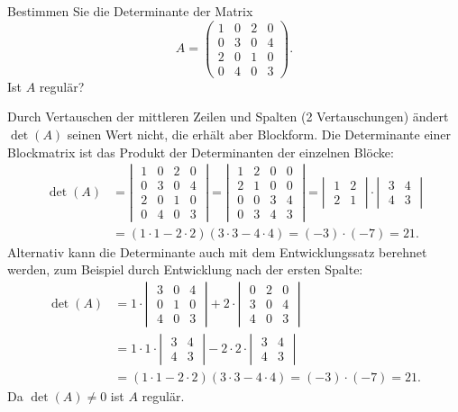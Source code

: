 Bestimmen Sie die Determinante der Matrix
\[
A=\begin{pmatrix}
1&0&2&0\\
0&3&0&4\\
2&0&1&0\\
0&4&0&3
\end{pmatrix}.
\]
Ist $A$ regulär?


\begin{loesung}
Durch Vertauschen der mittleren Zeilen und Spalten (2 Vertauschungen) ändert $\det(A)$
seinen Wert nicht, die erhält aber Blockform. Die Determinante einer Blockmatrix ist
das Produkt der Determinanten der einzelnen Blöcke:
\begin{align*}
\det(A)&=
\left|\;\begin{matrix}
1&0&2&0\\
0&3&0&4\\
2&0&1&0\\
0&4&0&3
\end{matrix}\;\right|
=
\left|\;\begin{matrix}
1&2&0&0\\
2&1&0&0\\
0&0&3&4\\
0&3&4&3
\end{matrix}\;\right|
=
\left|\;\begin{matrix}
1&2\\2&1
\end{matrix}\;\right|
\cdot
\left|\;\begin{matrix}
3&4\\4&3
\end{matrix}\;\right|
\\
&=
(1\cdot 1-2\cdot 2)(3\cdot 3-4\cdot 4)=(-3)\cdot(-7)=21.
\end{align*}
Alternativ kann die Determinante auch mit dem Entwicklungssatz
berehnet werden, zum Beispiel durch Entwicklung nach der ersten
Spalte:
\begin{align*}
\det(A)
&=
1\cdot\left|\;\begin{matrix}
3&0&4\\
0&1&0\\
4&0&3
\end{matrix}\;\right|
+
2\cdot\left|\;\begin{matrix}
0&2&0\\
3&0&4\\
4&0&3
\end{matrix}\;\right|
\\
&=
1\cdot 1\cdot\left|\;\begin{matrix}3&4\\4&3\end{matrix}\;\right|
-2\cdot 2\cdot\left|\;\begin{matrix}3&4\\4&3\end{matrix}\;\right|
\\
&=
(1\cdot 1-2\cdot 2)(3\cdot 3-4\cdot 4)=(-3)\cdot(-7)=21.
\end{align*}
Da $\det(A)\ne 0$ ist $A$ regulär.
\end{loesung}

